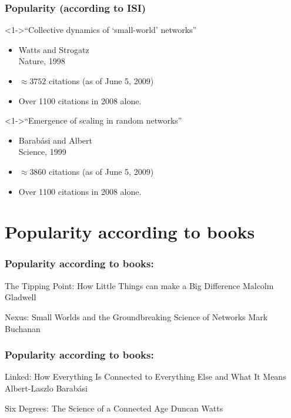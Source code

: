 \begin{frame}
  \frametitle{Popularity (according to ISI)}

  \begin{block}<1->{``Collective dynamics of `small-world' networks''\cite{watts1998a}}
    \begin{itemize}
    \item 
      Watts and Strogatz\\
      Nature, 1998
    \item 
      \alert{$\approx 3752$} citations {\tiny(as of June 5, 2009)}\\
    \item 
      Over 1100 citations in 2008 alone.
    \end{itemize}
  \end{block}

  \begin{block}<1->{``Emergence of scaling in random networks''\cite{barabasi1999a}}
    \begin{itemize}
    \item 
      Barab\'{a}si and Albert\\
      Science, 1999
    \item 
      \alert{$\approx 3860$} citations {\tiny(as of June 5, 2009)}
    \item 
      Over 1100 citations in 2008 alone.
    \end{itemize}
  \end{block}
\end{frame}

\section{Popularity according to books}

\begin{frame}
  \frametitle{Popularity according to books:}

  {The Tipping Point: How Little Things can make a Big Difference}
  {Malcolm Gladwell\cite{gladwell2000a}}

  \bigskip

  {Nexus: Small Worlds and the Groundbreaking Science of Networks}
  {Mark Buchanan}

\end{frame}

\begin{frame}
  \frametitle{Popularity according to books:}

  {Linked: How Everything Is Connected to Everything Else and What It Means}
  {Albert-Laszlo Barab\'{a}si}

  \bigskip

  {Six Degrees: The Science of a Connected Age}
  {Duncan Watts\cite{watts2003a}}

\end{frame}

